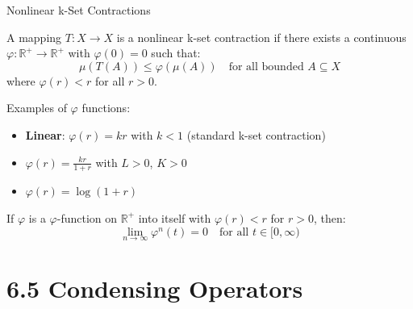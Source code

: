 \documentclass[aspectratio=169,10pt]{beamer}
\begin{document}
\begin{frame}{Nonlinear k-Set Contractions}

\begin{definition}
A mapping $T: X \to X$ is a \alert{nonlinear k-set contraction} if there exists a continuous $\varphi: \mathbb{R}^+ \to \mathbb{R}^+$ with $\varphi(0) = 0$ such that:
\[
\mu(T(A)) \leq \varphi(\mu(A)) \quad \text{for all bounded } A \subseteq X
\]
where $\varphi(r) < r$ for all $r > 0$.
\end{definition}

\vspace{0.3cm}

Examples of $\varphi$ functions:
\begin{itemize}
    \item \textbf{Linear}: $\varphi(r) = kr$ with $k < 1$ (standard k-set contraction)
    \item $\varphi(r) = \frac{kr}{1+r}$ with $L > 0$, $K > 0$
    \item $\varphi(r) = \log(1 + r)$
\end{itemize}

\vspace{0.3cm}

\begin{lemma}
If $\varphi$ is a $\varphi$-function on $\mathbb{R}^+$ into itself with $\varphi(r) < r$ for $r > 0$, then:
\[
\lim_{n \to \infty} \varphi^n(t) = 0 \quad \text{for all } t \in [0, \infty)
\]
\end{lemma}

\end{frame}

\section{6.5 Condensing Operators}
\end{document}

